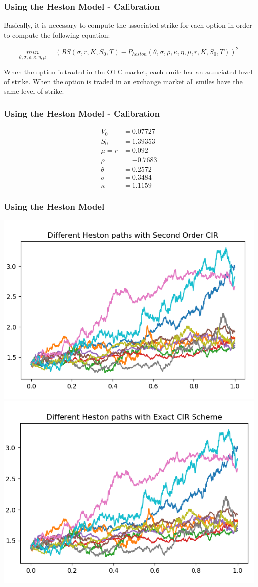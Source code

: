 \documentclass[12pt]{beamer}
\begin{document}
\begin{frame}
\frametitle{Using the Heston Model - Calibration}
Basically, it is necessary to compute the associated strike for each option in order to compute the following equation:

$$\underset{\theta,\sigma,\rho,\kappa,\eta,\mu}{min}=(BS(\sigma,r,K,S_{0},T)-P_{heston}(\theta,\sigma,\rho,\kappa,\eta,\mu,r,K,S_{0},T))^2$$

When the option is traded in the OTC market, each smile has an associated level of strike. When the option is traded in an exchange market all smiles have the same level of strike.
\end{frame}

\begin{frame}
\frametitle{Using the Heston Model - Calibration}

\begin{align*}
V_0 &= 0.07727 \\
S_0 &= 1.39353 \\
\mu = r &= 0.092 \\
\rho &= -0.7683 \\
\theta &= 0.2572 \\
\sigma &= 0.3484 \\
\kappa &= 1.1159
\end{align*}

\end{frame}


\begin{frame}
\frametitle{Using the Heston Model}
\centering
\includegraphics[width=.5\textwidth]{heston_cir21000.png}
\includegraphics[width=.5\textwidth]{heston_exact1000.png}
\end{frame}
\end{document}
